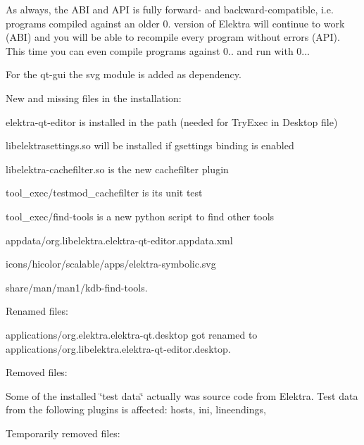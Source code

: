 As always, the A\+BI and A\+PI is fully forward-\/ and backward-\/compatible, i.\+e. programs compiled against an older 0. version of Elektra will continue to work (A\+BI) and you will be able to recompile every program without errors (A\+PI). This time you can even compile programs against 0.. and run with 0...

For the qt-\/gui the svg module is added as dependency.

New and missing files in the installation\+:


\begin{DoxyItemize}
\item {\ttfamily elektra-\/qt-\/editor} is installed in the path (needed for Try\+Exec in Desktop file)
\item {\ttfamily libelektrasettings.\+so} will be installed if {\ttfamily gsettings} binding is enabled
\item {\ttfamily libelektra-\/cachefilter.\+so} is the new cachefilter plugin
\item {\ttfamily tool\+\_\+exec/testmod\+\_\+cachefilter} is its unit test
\item {\ttfamily tool\+\_\+exec/find-\/tools} is a new python script to find other tools
\item {\ttfamily appdata/org.\+libelektra.\+elektra-\/qt-\/editor.\+appdata.\+xml}
\item {\ttfamily icons/hicolor/scalable/apps/elektra-\/symbolic.\+svg}
\item {\ttfamily share/man/man1/kdb-\/find-\/tools.}
\end{DoxyItemize}

Renamed files\+:


\begin{DoxyItemize}
\item {\ttfamily applications/org.\+elektra.\+elektra-\/qt.\+desktop} got renamed to {\ttfamily applications/org.\+libelektra.\+elektra-\/qt-\/editor.\+desktop}.
\end{DoxyItemize}

Removed files\+:


\begin{DoxyItemize}
\item Some of the installed \char`\"{}test data\char`\"{} actually was source code from Elektra. Test data from the following plugins is affected\+: {\ttfamily hosts}, {\ttfamily ini}, {\ttfamily lineendings},
\end{DoxyItemize}

Temporarily removed files\+:


